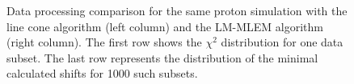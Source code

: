 \begin{figure}
  \caption{Data processing comparison for the same proton simulation with the line cone algorithm (left column) and the LM-MLEM algorithm (right column). The first row shows the $\chi^2$ distribution for one data subset. The last row represents the distribution of the minimal calculated shifts for 1000 such subsets.}%
\end{figure}

